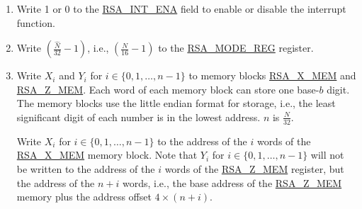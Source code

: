 \documentclass[main\_\_EN.tex]{subfiles}
\begin{document}
\begin{enumerate}

    \item Write 1 or 0 to the \hyperref[fielddesc:RSAINTENA]{RSA\_INT\_ENA} field to enable or disable the interrupt function.

    \item Write \begin{math}( \frac{\hat{N}}{32} - 1 )\end{math}, i.e., \begin{math}( \frac{N}{16} - 1 )\end{math} to the \hyperref[regdesc:RSAMODEREG]{RSA\_MODE\_REG} register.

    \item Write \begin{math}{X}_{i}\end{math} and \begin{math}{Y}_{i}\end{math} for \begin{math}i \in \{ 0, 1, \dots, n-1 \} \end{math} to memory blocks \hyperref[regdesc:RSAmemory]{RSA\_X\_MEM} and \hyperref[regdesc:RSAmemory]{RSA\_Z\_MEM}. Each word of each memory block can store one base-\begin{math}b\end{math} digit. The memory blocks use the little endian format for storage, i.e., the least significant digit of each number is in the lowest address. \begin{math}n\end{math} is \begin{math} \frac{N}{32} \end{math}.

         Write \begin{math}{X}_{i}\end{math} for \begin{math}i \in \{ 0, 1, \dots, n-1 \} \end{math} to the address of the \begin{math}i\end{math} words of the \hyperref[regdesc:RSAmemory]{RSA\_X\_MEM} memory block. Note that \begin{math}{Y}_{i}\end{math} for \begin{math}i \in \{ 0, 1, \dots, n-1 \} \end{math} will not be written to the address of the \begin{math}i\end{math} words of the \hyperref[regdesc:RSAmemory]{RSA\_Z\_MEM} register, but the address of the \begin{math}n+i\end{math} words, i.e., the base address of the \hyperref[regdesc:RSAmemory]{RSA\_Z\_MEM} memory plus the address offset \begin{math}4 \times (n+i) \end{math}.


\end{enumerate}
\end{document}

